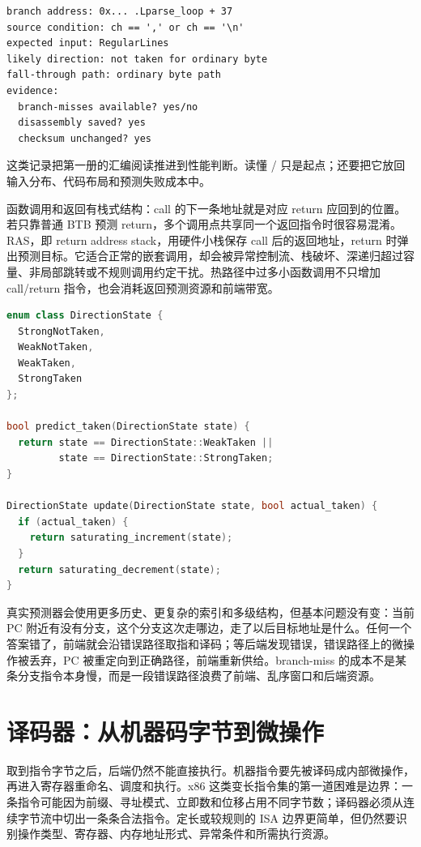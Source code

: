 \begin{lstlisting}[numbers=none,caption={从反汇编记录分支证据}]
branch address: 0x... .Lparse_loop + 37
source condition: ch == ',' or ch == '\n'
expected input: RegularLines
likely direction: not taken for ordinary byte
fall-through path: ordinary byte path
evidence:
  branch-misses available? yes/no
  disassembly saved? yes
  checksum unchanged? yes
\end{lstlisting}

这类记录把第一册的汇编阅读推进到性能判断。读懂 / 只是起点；还要把它放回输入分布、代码布局和预测失败成本中。

函数调用和返回有栈式结构：call 的下一条地址就是对应 return 应回到的位置。若只靠普通 BTB 预测 return，多个调用点共享同一个返回指令时很容易混淆。RAS，即 return address stack，用硬件小栈保存 call 后的返回地址，return 时弹出预测目标。它适合正常的嵌套调用，却会被异常控制流、栈破坏、深递归超过容量、非局部跳转或不规则调用约定干扰。热路径中过多小函数调用不只增加 call/return 指令，也会消耗返回预测资源和前端带宽。

\begin{lstlisting}[language=C++,caption={两位分支方向预测器的抽象形态}]
enum class DirectionState {
  StrongNotTaken,
  WeakNotTaken,
  WeakTaken,
  StrongTaken
};

bool predict_taken(DirectionState state) {
  return state == DirectionState::WeakTaken ||
         state == DirectionState::StrongTaken;
}

DirectionState update(DirectionState state, bool actual_taken) {
  if (actual_taken) {
    return saturating_increment(state);
  }
  return saturating_decrement(state);
}
\end{lstlisting}

真实预测器会使用更多历史、更复杂的索引和多级结构，但基本问题没有变：当前 PC 附近有没有分支，这个分支这次走哪边，走了以后目标地址是什么。任何一个答案错了，前端就会沿错误路径取指和译码；等后端发现错误，错误路径上的微操作被丢弃，PC 被重定向到正确路径，前端重新供给。branch-miss 的成本不是某条分支指令本身慢，而是一段错误路径浪费了前端、乱序窗口和后端资源。

\section{译码器：从机器码字节到微操作}

取到指令字节之后，后端仍然不能直接执行。机器指令要先被译码成内部微操作，再进入寄存器重命名、调度和执行。x86 这类变长指令集的第一道困难是边界：一条指令可能因为前缀、寻址模式、立即数和位移占用不同字节数；译码器必须从连续字节流中切出一条条合法指令。定长或较规则的 ISA 边界更简单，但仍然要识别操作类型、寄存器、内存地址形式、异常条件和所需执行资源。

